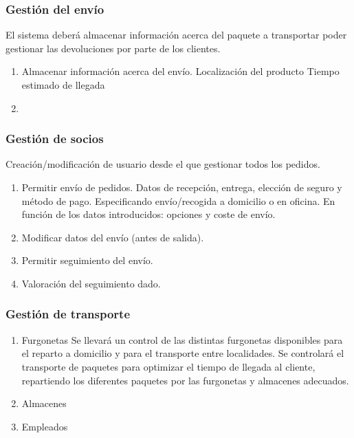 \subsubsection{Gestión del envío}	
El sistema deberá almacenar información acerca del paquete a transportar poder gestionar las devoluciones por parte de los clientes.  
\begin{enumerate}
	\item Almacenar información acerca del envío.
	\subitem Localización del producto
	\subitem Tiempo estimado de llegada
	\item 
\end{enumerate}

\subsubsection{Gestión de socios}
Creación/modificación de usuario desde el que gestionar todos los pedidos.

\begin{enumerate}
	\item Permitir envío de pedidos.
	\subitem Datos de recepción, entrega, elección de seguro y método de pago. Especificando envío/recogida a domicilio o en oficina.
	\subitem En función de los datos introducidos: opciones y coste de envío.
	\item Modificar datos del envío (antes de salida).
	\item Permitir seguimiento del envío.
	\item Valoración del seguimiento dado.
	
\end{enumerate}

\subsubsection{Gestión de transporte}

\begin{enumerate}
\item Furgonetas
\subitem Se llevará un control de las distintas furgonetas disponibles para el reparto a domicilio y para el transporte entre localidades.
\subitem
\subitem Se controlará el transporte de paquetes para optimizar el tiempo de llegada al cliente, repartiendo los diferentes paquetes por las furgonetas y almacenes adecuados.
\item Almacenes
\item Empleados
	
\end{enumerate}



